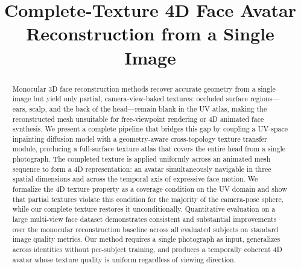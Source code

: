 \documentclass[conference]{IEEEtran}
\begin{document}
\title{Complete-Texture 4D Face Avatar Reconstruction from a Single Image}

\author{
  \and
  \and
}

\maketitle

\begin{abstract}
Monocular 3D face reconstruction methods recover accurate geometry from a
single image but yield only partial, camera-view-baked textures: occluded
surface regions---ears, scalp, and the back of the head---remain blank in the
UV atlas, making the reconstructed mesh unsuitable for free-viewpoint rendering
or 4D animated face synthesis. We present a complete pipeline that bridges this
gap by coupling a UV-space inpainting diffusion model with a geometry-aware
cross-topology texture transfer module, producing a full-surface texture atlas
that covers the entire head from a single photograph. The completed texture is
applied uniformly across an animated mesh sequence to form a 4D representation:
an avatar simultaneously navigable in three spatial dimensions and across the
temporal axis of expressive face motion. We formalize the 4D texture property
as a coverage condition on the UV domain and show that partial textures violate
this condition for the majority of the camera-pose sphere, while our complete
texture restores it unconditionally. Quantitative evaluation on a large
multi-view face dataset demonstrates consistent and substantial improvements
over the monocular reconstruction baseline across all evaluated subjects on
standard image quality metrics. Our method requires a single photograph as
input, generalizes across identities without per-subject training, and produces
a temporally coherent 4D avatar whose texture quality is uniform regardless of
viewing direction.
\end{abstract}
\end{document}
